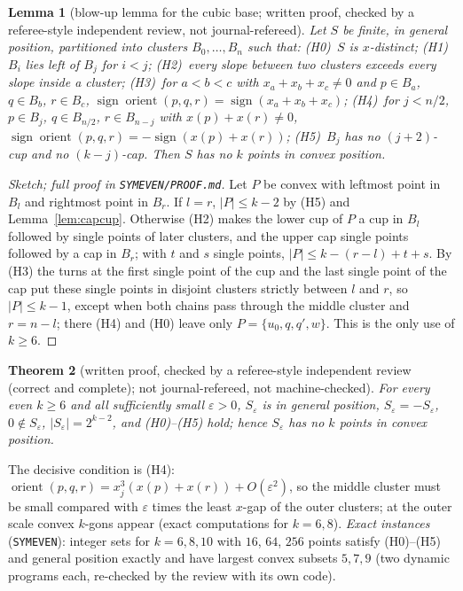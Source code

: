 \documentclass[10pt]{article}
\newtheorem{theorem}{Theorem}[section]
\newtheorem{lemma}[theorem]{Lemma}
\theoremstyle{definition}
\theoremstyle{remark}
\newcommand{\orient}{\operatorname{orient}}
\newcommand{\dirn}[1]{{\upshape\nolinkurl{#1}}}
\begin{document}
\begin{lemma}[blow-up lemma for the cubic base; written proof, checked by a referee-style independent review, not
journal-refereed]\label{lem:cubic}
Let $S$ be finite, in general position, partitioned into clusters $B_0,\dots,B_n$ such that: (H0)~$S$ is $x$-distinct;
(H1)~$B_i$ lies left of $B_j$ for $i<j$; (H2)~every slope between two clusters exceeds every slope inside a cluster;
(H3)~for $a<b<c$ with $x_a+x_b+x_c\ne0$ and $p\in B_a$, $q\in B_b$, $r\in B_c$, $\operatorname{sign}\orient(p,q,r)=
\operatorname{sign}(x_a+x_b+x_c)$; (H4)~for $j<n/2$, $p\in B_j$, $q\in B_{n/2}$, $r\in B_{n-j}$ with $x(p)+x(r)\ne0$,
$\operatorname{sign}\orient(p,q,r)=-\operatorname{sign}(x(p)+x(r))$; (H5)~$B_j$ has no $(j+2)$-cup and no $(k-j)$-cap.
Then $S$ has no $k$ points in convex position.
\end{lemma}

\begin{proof}[Sketch; full proof in \dirn{SYMEVEN/PROOF.md}]
Let $P$ be convex with leftmost point in $B_l$ and rightmost point in $B_r$. If $l=r$, $|P|\le k-2$ by (H5) and
Lemma~\ref{lem:capcup}. Otherwise (H2) makes the lower cup of $P$ a cup in $B_l$ followed by single points of later
clusters, and the upper cap single points followed by a cap in $B_r$; with $t$ and $s$ single points,
$|P|\le k-(r-l)+t+s$. By (H3) the turns at the first single point of the cup and the last single point of the cap put
these single points in disjoint clusters strictly between $l$ and $r$, so $|P|\le k-1$, except when both chains pass
through the middle cluster and $r=n-l$; there (H4) and (H0) leave only $P=\{u_0,q,q',w\}$. This is the only use of
$k\ge6$.
\end{proof}

\begin{theorem}[written proof, checked by a referee-style independent review (correct and complete); not
journal-refereed, not machine-checked]\label{thm:central-even}
For every even $k\ge6$ and all sufficiently small $\varepsilon>0$, $S_\varepsilon$ is in general position,
$S_\varepsilon=-S_\varepsilon$, $0\notin S_\varepsilon$, $|S_\varepsilon|=2^{k-2}$, and (H0)--(H5) hold; hence
$S_\varepsilon$ has no $k$ points in convex position.
\end{theorem}

The decisive condition is (H4): $\orient(p,q,r)=x_j^3(x(p)+x(r))+O(\varepsilon^2)$, so the middle cluster must be small
compared with $\varepsilon$ times the least $x$-gap of the outer clusters; at the outer scale convex $k$-gons appear (exact
computations for $k=6,8$). \emph{Exact instances} (\dirn{SYMEVEN}): integer sets for $k=6,8,10$ with $16$, $64$, $256$
points satisfy (H0)--(H5) and general position exactly and have largest convex subsets $5,7,9$ (two dynamic programs
each, re-checked by the review with its own code).
\end{document}
